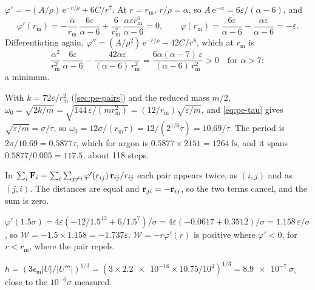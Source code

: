 $\varphi' = -(A/\rho)\,\mathrm{e}^{-r/\rho} +
6C/r^7$. At $r = r_{\mathrm m}$, $r/\rho = \alpha$, so $A\,\mathrm{e}^
{-\alpha} = 6\varepsilon/(\alpha - 6)$, and
\begin{equation*}
   \varphi'(r_{\mathrm m}) = -\frac{\alpha}{r_{\mathrm m}}\,
   \frac{6\varepsilon}{\alpha - 6} + \frac{6}{r_{\mathrm m}^7}\,
   \frac{\alpha\varepsilon r_{\mathrm m}^6}{\alpha - 6} = 0 ,
   \qquad
   \varphi(r_{\mathrm m}) = \frac{6\varepsilon}{\alpha - 6}
   - \frac{\alpha\varepsilon}{\alpha - 6} = -\varepsilon .
\end{equation*}
Differentiating again, $\varphi'' = (A/\rho^2)\,\mathrm{e}^{-r/\rho} -
42C/r^8$, which at $r_{\mathrm m}$ is
\begin{equation*}
   \frac{\alpha^2}{r_{\mathrm m}^2}\,\frac{6\varepsilon}{\alpha - 6}
   - \frac{42\alpha\varepsilon}{(\alpha - 6)\,r_{\mathrm m}^2}
   = \frac{6\alpha(\alpha - 7)\,\varepsilon}{(\alpha - 6)\,r_{\mathrm m}^2}
   > 0 \quad\text{for } \alpha > 7 :
\end{equation*}
a minimum.

With $k = 72\varepsilon/r_{\mathrm m}^2$
(\cref{sec:pe-pairs}) and the reduced mass $m/2$, $\omega_0 =
\sqrt{2k/m} = \sqrt{144\,\varepsilon/(m r_{\mathrm m}^2)} =
(12/r_{\mathrm m})\sqrt{\varepsilon/m}$, and \cref{eq:pe-tau} gives
$\sqrt{\varepsilon/m} = \sigma/\tau$, so $\omega_0 = 12\sigma/(r_{\mathrm
m}\tau) = 12/(2^{1/6}\tau) = 10.69/\tau$. The period is $2\pi/10.69 =
0.5877\tau$, which for argon is $0.5877\times2151 =
\SI{1264}{\femto\second}$, and it spans $0.5877/0.005 = 117.5$, about 118
steps.

In $\sum_i\bm{\mathrm{F}}_i = \sum_i\sum_{j\ne
i}\varphi'(r_{ij})\,\bm{\mathrm{r}}_{ij}/r_{ij}$ each pair appears twice, as $(i,
j)$ and as $(j, i)$. The distances are equal and $\bm{\mathrm{r}}_{ji} =
-\bm{\mathrm{r}}_{ij}$, so the two terms cancel, and the sum is zero.

$\varphi'(1.5\sigma) = 4\varepsilon(-12/1.5^{13}
+ 6/1.5^7)/\sigma = 4\varepsilon(-0.0617 + 0.3512)/\sigma =
1.158\,\varepsilon/\sigma$, so $\mathcal{W} = -1.5\times1.158 =
-1.737\varepsilon$. $\mathcal{W} = -r\varphi'(r)$ is positive where $\varphi' < 0$,
for $r < r_{\mathrm m}$, where the pair repels.

$h = (3\epsilon_{\mathrm m}\lvert U\rvert/
\lvert U'''\rvert)^{1/3} = (3\times\num{2.2e-16}\times10.75/10^4)^{1/3} =
\num{8.9e-7}\,\sigma$, close to the $10^{-6}\sigma$ measured.

